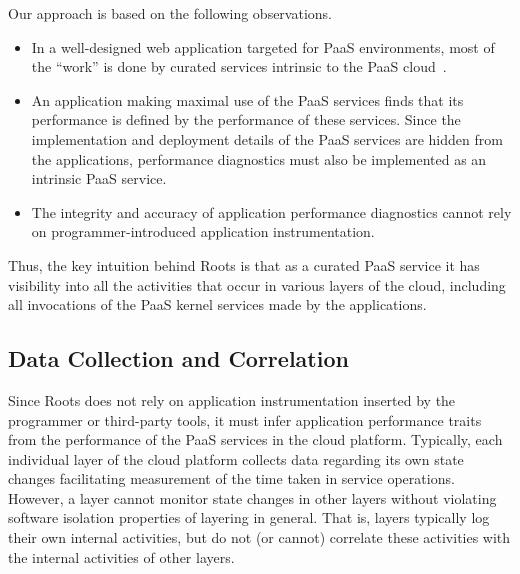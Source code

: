 Our approach is based on the following observations.
\begin{itemize}
\item In a well-designed web application targeted for PaaS environments, 
most of the ``work'' is done by
curated services intrinsic to the PaaS cloud~\cite{Jayathilaka:2015:RTS:2806777.2806842}.
\item An application making maximal use of the PaaS services finds that its
performance is defined by the performance of these services.  Since the 
implementation and deployment details of the PaaS services are hidden
from the applications,
performance diagnostics must also be implemented as an intrinsic PaaS service.
\item The integrity and accuracy of application performance diagnostics
cannot rely on programmer-introduced application instrumentation.
\end{itemize}
Thus, the key intuition behind Roots is that as a curated PaaS service
it has visibility into all the activities that occur in various layers of the cloud,
including all invocations of the PaaS kernel services made by the applications.

%

\subsection{Data Collection and Correlation}

Since Roots does not rely on application instrumentation inserted by the
programmer or third-party tools, it must infer application performance traits from 
the performance of the PaaS services in the cloud platform. 
Typically, each individual layer of the cloud platform collects data regarding
its own state changes facilitating measurement of the time taken in service
operations. However, a layer cannot monitor state changes
in other layers without violating software isolation properties of
layering in general.   That is, layers typically log their own internal
activities, but do not (or cannot) correlate these activities
with the internal activities of other layers.
 
